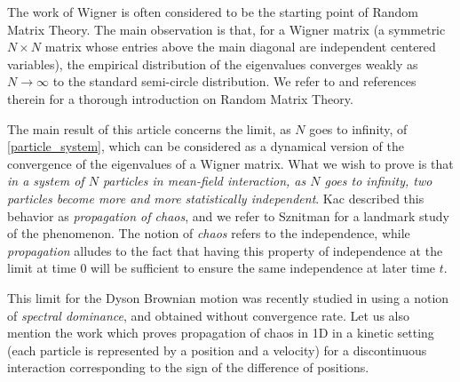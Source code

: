 \documentclass[10pt]{amsart}
\theoremstyle{plain}
\theoremstyle{definition}
\begin{document}
The work of Wigner \cite{Wigner} is often considered to be the starting point of Random Matrix Theory. The main observation is that, for a Wigner matrix (a symmetric $N\times N$ matrix whose entries above the main diagonal are independent centered variables), the empirical distribution of the eigenvalues converges weakly as $N\to\infty$ to the standard semi-circle distribution. We refer to \cite{anderson_guionnet_zeitouni_2009} and references therein for a thorough introduction on Random Matrix Theory.

The main result of this article concerns the limit, as $N$ goes to infinity, of \eqref{particle_system}, which can be considered as a dynamical version of the convergence of the eigenvalues of a Wigner matrix. What we wish to prove is that \textit{in a system of $N$ particles in mean-field interaction, as $N$ goes to infinity, two particles become more and more statistically independent}. Kac \cite{kac1956} described this behavior as \textit{propagation of chaos}, and we refer to Sznitman \cite{Saint_Flour_1991} for a landmark study of the phenomenon. The notion of \textit{chaos} refers to the independence, while \textit{propagation} alludes to the fact that having this property of independence at the limit at time $0$ will be sufficient to ensure the same independence at later time $t$.

This limit for the Dyson Brownian motion was recently studied in \cite{BDLL21} using a notion of \textit{spectral dominance}, and obtained without convergence rate. Let us also mention the work \cite{HS19} which proves propagation of chaos in 1D in a kinetic setting (\ie each particle is represented by a position and a velocity) for a discontinuous interaction corresponding to the sign of the difference of positions.
\end{document}
